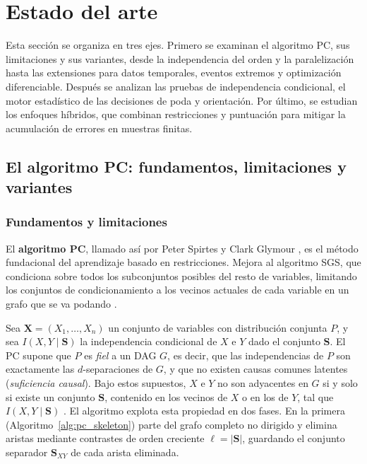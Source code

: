\section{Estado del arte}

Esta sección se organiza en tres ejes. Primero se examinan el algoritmo PC, sus limitaciones y sus variantes, desde la independencia del orden y la paralelización hasta las extensiones para datos temporales, eventos extremos y optimización diferenciable. Después se analizan las pruebas de independencia condicional, el motor estadístico de las decisiones de poda y orientación. Por último, se estudian los enfoques híbridos, que combinan restricciones y puntuación para mitigar la acumulación de errores en muestras finitas.

\subsection{El algoritmo PC: fundamentos, limitaciones y variantes}
\label{sec:variantes_pc}

\subsubsection{Fundamentos y limitaciones}

El \textbf{algoritmo PC}, llamado así por Peter Spirtes y Clark Glymour \citep{spirtes1991algorithm}, es el método fundacional del aprendizaje basado en restricciones. Mejora al algoritmo SGS, que condiciona sobre todos los subconjuntos posibles del resto de variables, limitando los conjuntos de condicionamiento a los vecinos actuales de cada variable en un grafo que se va podando \citep{spirtes2000causation}.

Sea $\mathbf{X} = (X_1, \ldots, X_n)$ un conjunto de variables con distribución conjunta $P$, y sea $I(X, Y \mid \mathbf{S})$ la independencia condicional de $X$ e $Y$ dado el conjunto $\mathbf{S}$. El PC supone que $P$ es \emph{fiel} a un DAG $G$, es decir, que las independencias de $P$ son exactamente las $d$-separaciones de $G$, y que no existen causas comunes latentes (\emph{suficiencia causal}). Bajo estos supuestos, $X$ e $Y$ no son adyacentes en $G$ si y solo si existe un conjunto $\mathbf{S}$, contenido en los vecinos de $X$ o en los de $Y$, tal que $I(X, Y \mid \mathbf{S})$ \citep{spirtes2000causation, abellan2006variations}. El algoritmo explota esta propiedad en dos fases. En la primera (Algoritmo~\ref{alg:pc_skeleton}) parte del grafo completo no dirigido y elimina aristas mediante contrastes de orden creciente $\ell = |\mathbf{S}|$, guardando el conjunto separador $\mathbf{S}_{XY}$ de cada arista eliminada.

